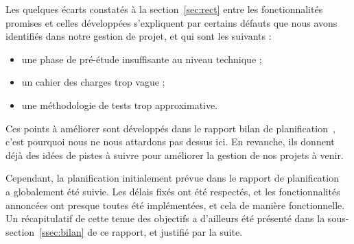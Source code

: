 Les quelques écarts constatés à la {\sc section}~\ref{sec:rect} entre les fonctionnalités promises et celles développées s'expliquent par certains défauts que nous avons identifiés dans notre gestion de projet, et qui sont les suivants : 

\begin{itemize}
\item une phase de pré-étude insuffisante au niveau technique ;
\item un cahier des charges trop vague ;
\item une méthodologie de tests trop approximative.
\end{itemize}

Ces points à améliorer sont développés dans le rapport bilan de planification~\cite{bilanPlanif}, c'est pourquoi nous ne nous attardons pas dessus ici. En revanche, ils donnent déjà des idées de pistes à suivre pour améliorer la gestion de nos projets à venir.

Cependant, la planification initialement prévue dans le rapport de planification~\cite{planif} a globalement été suivie. Les délais fixés ont été respectés, et les fonctionnalités annoncées ont presque toutes été implémentées, et cela de manière fonctionnelle. Un récapitulatif de cette tenue des objectifs a d'ailleurs été présenté dans la {\sc sous-section}~\ref{ssec:bilan} de ce rapport, et justifié par la suite. 